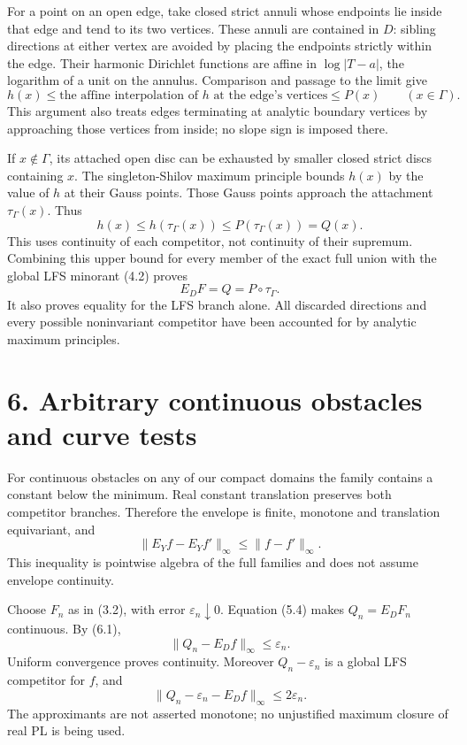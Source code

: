 \documentclass[11pt]{article}
\begin{document}
For a point on an open edge, take closed strict annuli whose endpoints lie inside that edge and tend to its two vertices. These annuli are contained in \(D\): sibling directions at either vertex are avoided by placing the endpoints strictly within the edge. Their harmonic Dirichlet functions are affine in \(\log|T-a|\), the logarithm of a unit on the annulus. Comparison and passage to the limit give
\[
h(x)\leq\text{the affine interpolation of }h\text{ at the edge's vertices}
\leq P(x)\qquad(x\in\Gamma).
\tag{5.3}
\]
This argument also treats edges terminating at analytic boundary vertices by approaching those vertices from inside; no slope sign is imposed there.

If \(x\notin\Gamma\), its attached open disc can be exhausted by smaller closed strict discs containing \(x\). The singleton-Shilov maximum principle bounds \(h(x)\) by the value of \(h\) at their Gauss points. Those Gauss points approach the attachment \(\tau_\Gamma(x)\). Thus
\[
h(x)\leq h(\tau_\Gamma(x))\leq P(\tau_\Gamma(x))=Q(x).
\]
This uses continuity of each competitor, not continuity of their supremum. Combining this upper bound for every member of the exact full union with the global LFS minorant (4.2) proves
\[
E_DF=Q=P\circ\tau_\Gamma.
\tag{5.4}
\]
It also proves equality for the LFS branch alone. All discarded directions and every possible noninvariant competitor have been accounted for by analytic maximum principles.

\section*{6. Arbitrary continuous obstacles and curve tests}

For continuous obstacles on any of our compact domains the family contains a constant below the minimum. Real constant translation preserves both competitor branches. Therefore the envelope is finite, monotone and translation equivariant, and
\[
\|E_Yf-E_Yf'\|_\infty\leq\|f-f'\|_\infty.
\tag{6.1}
\]
This inequality is pointwise algebra of the full families and does not assume envelope continuity.

Choose \(F_n\) as in (3.2), with error \(\varepsilon_n\downarrow0\). Equation (5.4) makes \(Q_n=E_DF_n\) continuous. By (6.1),
\[
\|Q_n-E_Df\|_\infty\leq\varepsilon_n.
\]
Uniform convergence proves continuity. Moreover \(Q_n-\varepsilon_n\) is a global LFS competitor for \(f\), and
\[
\|Q_n-\varepsilon_n-E_Df\|_\infty\leq2\varepsilon_n.
\tag{6.2}
\]
The approximants are not asserted monotone; no unjustified maximum closure of real PL is being used.
\end{document}
